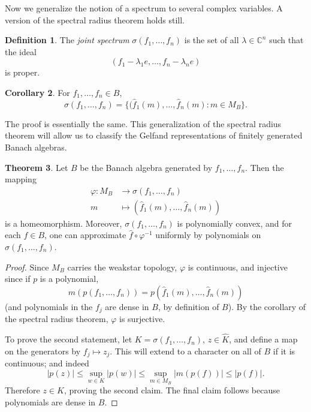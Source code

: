 \documentclass[12pt]{report}
\newcommand{\CC}{\mathbb{C}}
\newcommand{\dfn}[1]{\emph{#1}\index{#1}}
\theoremstyle{definition}
\newtheorem{theorem}{Theorem}[chapter]
\newtheorem{corollary}[theorem]{Corollary}
\newtheorem{definition}[theorem]{Definition}
\begin{document}
    Now we generalize the notion of a spectrum to several complex variables. A version of the spectral radius theorem holds still.
\begin{definition}
    The \dfn{joint spectrum} $\sigma(f_1, \dots, f_n)$ is the set of all $\lambda \in \CC^n$ such that the ideal
    $$(f_1 - \lambda_1 e, \dots, f_n -\lambda_n e)$$
    is proper.
\end{definition}
\begin{corollary}
    For $f_1, \dots, f_n \in B$,
    $$\sigma(f_1, \dots, f_n) = \{(\hat f_1(m), \dots, \hat f_n(m): m \in M_B\}.$$
\end{corollary}
    The proof is essentially the same. This generalization of the spectral radius theorem will allow us to classify the Gelfand representations of finitely generated Banach algebras.
\begin{theorem}
    Let $B$ be the Banach algebra generated by $f_1, \dots, f_n$. Then the mapping
\begin{align*}
    \varphi: M_B &\to \sigma(f_1, \dots, f_n)\\
    m &\mapsto (\hat f_1(m), \dots, \hat f_n(m))
\end{align*}
    is a homeomorphism. Moreover, $\sigma(f_1, \dots, f_n)$ is polynomially convex, and for each $f \in B$, one can approximate $\hat f \circ \varphi^{-1}$ uniformly by polynomials on $\sigma(f_1, \dots, f_n)$.
\end{theorem}
\begin{proof}
    Since $M_B$ carries the weakstar topology, $\varphi$ is continuous, and injective since if $p$ is a polynomial,
    $$m(p(f_1, \dots, f_n)) = p(\hat f_1(m), \dots, \hat f_n(m))$$
    (and polynomials in the $f_j$ are dense in $B$, by definition of $B$). By the corollary of the spectral radius theorem, $\varphi$ is surjective.
    
    To prove the second statement, let $K = \sigma(f_1, \dots, f_n)$, $z \in \hat K$, and define a map on the generators by $f_j \mapsto z_j$. This will extend to a character on all of $B$ if it is continuous; and indeed
    $$|p(z)| \leq \sup_{w \in K} |p(w)| \leq \sup_{m \in M_B} |m(p(f))| \leq |p(f)|.$$
    Therefore $z \in K$, proving the second claim. The final claim follows because polynomials are dense in $B$.
\end{proof}
    
\end{document}
